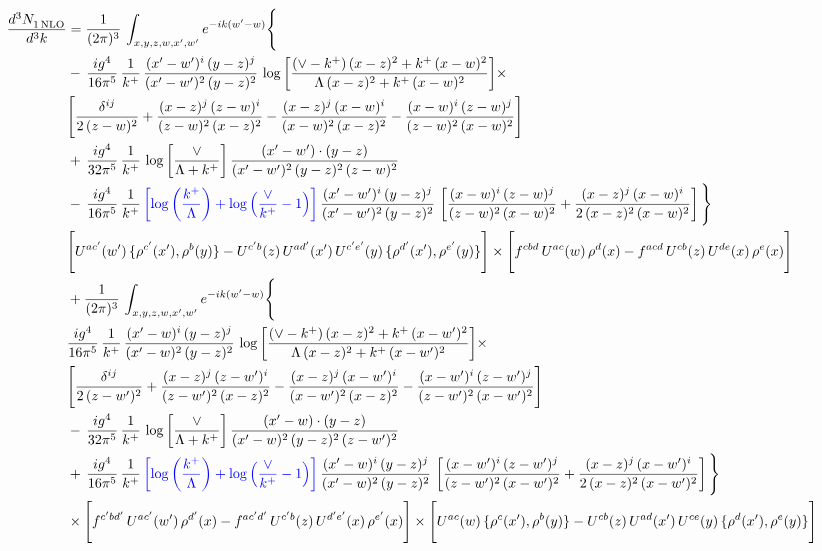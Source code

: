 \documentclass[9pt]{article}
\numberwithin{equation}{section}
\begin{document}
\begin{align}
 \frac{d^{3}N_{1\,\rm NLO}^{\rm}}{d^{3}k}  & =    \frac{1}{(2\pi)^{3}}\,\int_{x,y,z,w,x',w^{\prime}} e^{-ik(w^{\prime}-w)}\Bigg\{ \notag \\ & -\, \frac{ig^{4}}{16\pi^{5}}\,\frac{1}{k^{+}}\, \frac{(x'-w')^{i}\,(y-z)^{j}}{(x'-w')^{2}\,(y-z)^{2}}\,\log{\left[\frac{(\vee-k^{+})\,(x-z)^{2}+k^{+}\,(x-w)^{2}}{\Lambda\, (x-z)^{2}+k^{+}\,(x-w)^{2}}\right]}\times\notag \\ &  \Bigg[\frac{\delta^{ij}}{2\,(z-w)^{2}}+\frac{(x-z)^{j}\,(z-w)^{i}}{(z-w)^{2}\,(x-z)^{2}}-\frac{(x-z)^{j}\,(x-w)^{i}}{(x-w)^{2}\,(x-z)^{2}}-\frac{(x-w)^{i}\,(z-w)^{j}}{(z-w)^{2}\,(x-w)^{2}}\Bigg]\notag \\ & +\,\frac{ig^{4}}{32\pi^{5}}\,\frac{1}{k^{+}}\,\log{\left[\frac{\vee}{\Lambda + k^{+}}\right]}\, \frac{(x'-w')\cdot (y-z)}{(x'-w')^{2}\,(y-z)^{2}\,(z-w)^{2}}\notag \\ & -\, \frac{ig^{4}}{16\pi^{5}}\,\frac{1}{k^{+}}\,{\color{blue}\left[\log{\left(\frac{k^{+}}{\Lambda}\right)}+\log{\left(\frac{\vee}{k^{+}}-1\right)}\right]}\,\frac{(x'-w')^{i}\,(y-z)^{j}}{(x'-w')^{2}\,(y-z)^{2}}\,\left[\frac{(x-w)^{i}\,(z-w)^{j}}{(z-w)^{2}\,(x-w)^{2}}+\frac{(x-z)^{j}\,(x-w)^{i}}{2\,(x-z)^{2}\, (x-w)^{2}}\right]\Bigg\} \notag \\ & \Bigg[U^{ac'}(w')\,\{\rho^{c'}(x'),\rho^{b}(y)\}-U^{c'b}(z)\,U^{ad'}(x')\,U^{c'e'}(y)\, \{\rho^{d'}(x'),\rho^{e'}(y)\}\Bigg]\times \Bigg[f^{cbd}\,U^{ac}(w)\,\rho^{d}(x)-f^{acd}\, U^{cb}(z)\,U^{de}(x)\,\rho^{e}(x)\Bigg]\notag \\ & + \frac{1}{(2\pi)^{3}}\,\int_{x,y,z,w,x',w^{\prime}} e^{-ik(w^{\prime}-w)}\Bigg\{ \notag \\ &  \frac{ig^{4}}{16\pi^{5}}\,\frac{1}{k^{+}}\, \frac{(x'-w)^{i}\,(y-z)^{j}}{(x'-w)^{2}\,(y-z)^{2}}\,\log{\left[\frac{(\vee-k^{+})\,(x-z)^{2}+k^{+}\,(x-w')^{2}}{\Lambda\, (x-z)^{2} + k^{+}\,(x-w')^{2}}\right]}\times\notag \\ &  \Bigg[\frac{\delta^{ij}}{2\,(z-w')^{2}}+\frac{(x-z)^{j}\,(z-w')^{i}}{(z-w')^{2}\,(x-z)^{2}}-\frac{(x-z)^{j}\,(x-w')^{i}}{(x-w')^{2}\,(x-z)^{2}}-\frac{(x-w')^{i}\,(z-w')^{j}}{(z-w')^{2}\,(x-w')^{2}}\Bigg]\notag \\ & -\,\frac{ig^{4}}{32\pi^{5}}\,\frac{1}{k^{+}}\,\log{\left[\frac{\vee}{\Lambda + k^{+}}\right]}\, \frac{(x'-w)\cdot (y-z)}{(x'-w)^{2}\,(y-z)^{2}\,(z-w')^{2}}\notag \\ & +\,\frac{ig^{4}}{16\pi^{5}}\,\frac{1}{k^{+}}\,{\color{blue}\left[\log{\left(\frac{k^{+}}{\Lambda}\right)}+\log{\left(\frac{\vee}{k^{+}}-1\right)}\right]}\,\frac{(x'-w)^{i}\,(y-z)^{j}}{(x'-w)^{2}\,(y-z)^{2}}\,\left[\frac{(x-w')^{i}\,(z-w')^{j}}{(z-w')^{2}\,(x-w')^{2}}+\frac{(x-z)^{j}\,(x-w')^{i}}{2\,(x-z)^{2}\, (x-w')^{2}}\right] \Bigg\} \notag \\ & \times\Bigg[f^{c'bd'}\,U^{ac'}(w')\,\rho^{d'}(x)-f^{ac'd'}\, U^{c'b}(z)\,U^{d'e'}(x)\,\rho^{e'}(x)\Bigg] \times \Bigg[U^{ac}(w)\,\{\rho^{c}(x'),\rho^{b}(y)\}-U^{cb}(z)\,U^{ad}(x')\,U^{ce}(y)\, \{\rho^{d}(x'),\rho^{e}(y)\}\Bigg]
\end{align}
\end{document}
